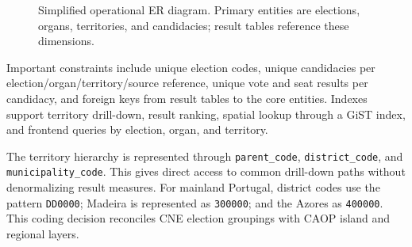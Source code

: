 \documentclass[11pt,twocolumn]{article}
\begin{document}
\begin{figure}[t]
\caption{Simplified operational ER diagram. Primary entities are elections, organs,
territories, and candidacies; result tables reference these dimensions.}
\label{fig:operational-er}
\end{figure}

Important constraints include unique election codes, unique candidacies per election/organ/territory/source reference, unique vote and seat results per candidacy, and foreign keys from result tables to the core entities. Indexes support territory drill-down, result ranking, spatial lookup through a GiST index, and frontend queries by election, organ, and territory.

The territory hierarchy is represented through \texttt{parent\_code}, \texttt{district\_code}, and \texttt{municipality\_code}. This gives direct access to common drill-down paths without denormalizing result measures. For mainland Portugal, district codes use the pattern \texttt{DD0000}; Madeira is represented as \texttt{300000}; and the Azores as \texttt{400000}. This coding decision reconciles CNE election groupings with CAOP island and regional layers.
\end{document}
